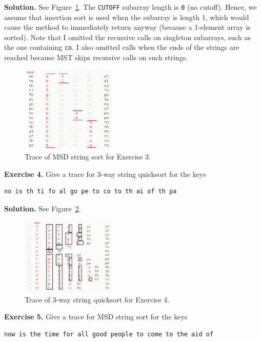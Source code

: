 \documentclass[12pt, a4paper]{article}
\newenvironment{ex}[2][Exercise]
{\par\medskip\noindent \textbf{#1 #2.}}
{\medskip}
\newenvironment{sol}[1][Solution]
{\par\medskip\noindent \textbf{#1.} }
{\medskip}
\begin{document}
	\begin{sol}
		See Figure~\ref{fig:ex-03}. The \texttt{CUTOFF} subarray length is \texttt{0} (no cutoff).
		Hence, we assume that insertion sort is used when the subarray is length 1, which
		would cause the method to immediately return anyway (because a 1-element array is sorted).
		Note that I omitted the recursive calls on singleton subarrays, such as the one containing
		\texttt{co}. I also omitted calls when the ends of the strings are reached because
		MST skips recursive calls on such strings.
		\begin{figure}
			\centering
			\includegraphics[width=0.4\textwidth]{exercise-03}
			\caption{Trace of MSD string sort for Exercise 3.}
			\label{fig:ex-03}
		\end{figure}
	\end{sol}
	\begin{ex}{4}
		Give a trace for 3-way string quicksort for the keys
		\begin{lstlisting}[language={}]
			no is th ti fo al go pe to co to th ai of th pa
		\end{lstlisting}
	\end{ex}
	\begin{sol}
		See Figure~\ref{fig:ex-04}.
		\begin{figure}
			\centering
			\includegraphics[width=0.4\textwidth]{exercise-04}
			\caption{Trace of 3-way string quicksort for Exercise 4.}
			\label{fig:ex-04}
		\end{figure}
	\end{sol}
	\begin{ex}{5}
		Give a trace for MSD string sort for the keys
		\begin{lstlisting}[language={}]
			now is the time for all good people to come to the aid of
		\end{lstlisting}
	\end{ex}
\end{document}
